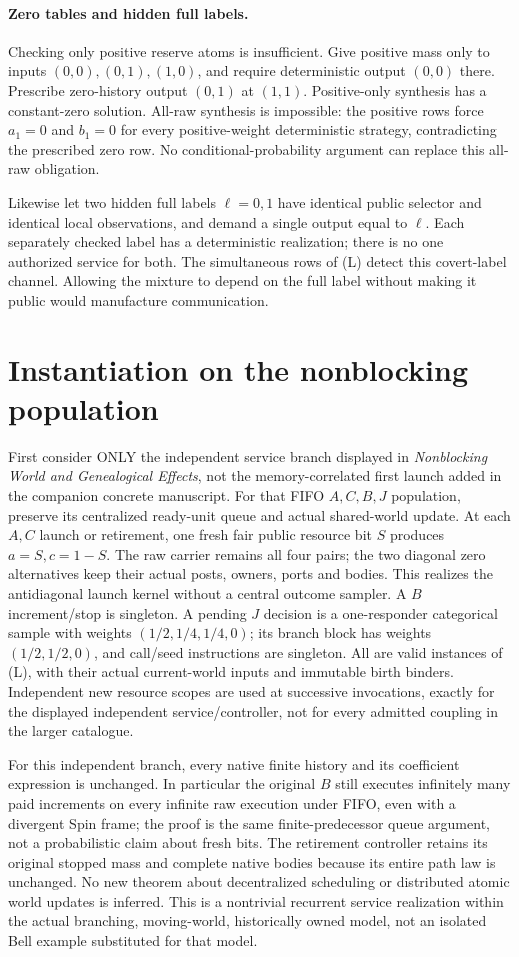 \documentclass[11pt]{article}
\begin{document}
\paragraph{Zero tables and hidden full labels.}
Checking only positive reserve atoms is insufficient. Give positive mass only to inputs $(0,0),(0,1),(1,0)$, and require deterministic output $(0,0)$ there. Prescribe zero-history output $(0,1)$ at $(1,1)$. Positive-only synthesis has a constant-zero solution. All-raw synthesis is impossible: the positive rows force $a_1=0$ and $b_1=0$ for every positive-weight deterministic strategy, contradicting the prescribed zero row. No conditional-probability argument can replace this all-raw obligation.

Likewise let two hidden full labels $\ell=0,1$ have identical public selector and identical local observations, and demand a single output equal to $\ell$. Each separately checked label has a deterministic realization; there is no one authorized service for both. The simultaneous rows of (L) detect this covert-label channel. Allowing the mixture to depend on the full label without making it public would manufacture communication.

\section{Instantiation on the nonblocking population}
First consider ONLY the independent service branch displayed in \emph{Nonblocking World and Genealogical Effects}, not the memory-correlated first launch added in the companion concrete manuscript. For that FIFO $A,C,B,J$ population, preserve its centralized ready-unit queue and actual shared-world update. At each $A,C$ launch or retirement, one fresh fair public resource bit $S$ produces $a=S,c=1-S$. The raw carrier remains all four pairs; the two diagonal zero alternatives keep their actual posts, owners, ports and bodies. This realizes the antidiagonal launch kernel without a central outcome sampler. A $B$ increment/stop is singleton. A pending $J$ decision is a one-responder categorical sample with weights $(1/2,1/4,1/4,0)$; its branch block has weights $(1/2,1/2,0)$, and call/seed instructions are singleton. All are valid instances of (L), with their actual current-world inputs and immutable birth binders. Independent new resource scopes are used at successive invocations, exactly for the displayed independent service/controller, not for every admitted coupling in the larger catalogue.

For this independent branch, every native finite history and its coefficient expression is unchanged. In particular the original $B$ still executes infinitely many paid increments on every infinite raw execution under FIFO, even with a divergent Spin frame; the proof is the same finite-predecessor queue argument, not a probabilistic claim about fresh bits. The retirement controller retains its original stopped mass and complete native bodies because its entire path law is unchanged. No new theorem about decentralized scheduling or distributed atomic world updates is inferred. This is a nontrivial recurrent service realization within the actual branching, moving-world, historically owned model, not an isolated Bell example substituted for that model.
\end{document}
